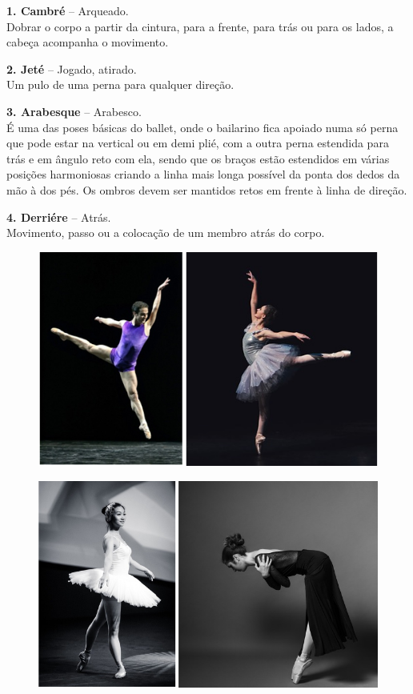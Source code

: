 \begin{mdframed}[linewidth=2pt,linecolor=salmao,backgroundcolor=salmao!20]
\textbf{1. Cambré} – Arqueado.\\
Dobrar o corpo a partir da cintura, para a frente, para trás ou para os
lados, a cabeça acompanha o movimento.

\bigskip
\noindent\textbf{2. Jeté} – Jogado, atirado.\\
Um pulo de uma perna para qualquer direção.

\bigskip
\noindent\textbf{3. Arabesque} – Arabesco.\\
É uma das poses básicas do ballet, onde o bailarino fica apoiado numa só
perna que pode estar na vertical ou em demi plié, com a outra perna
estendida para trás e em ângulo reto com ela, sendo que os braços estão
estendidos em várias posições harmoniosas criando a linha mais longa
possível da ponta dos dedos da mão à dos pés. Os ombros devem ser
mantidos retos em frente à linha de direção.

\bigskip
\noindent\textbf{4. Derriére} – Atrás.\\
Movimento, passo ou a colocação de um membro atrás do corpo.
\end{mdframed}

\pagebreak
\begin{figure}[htpb!]
\includegraphics[width=\textwidth]{./imgs/art15ab.png}
\end{figure}

\begin{figure}[htpb!]
\includegraphics[width=\textwidth]{./imgs/art15cd.png}
\end{figure}

